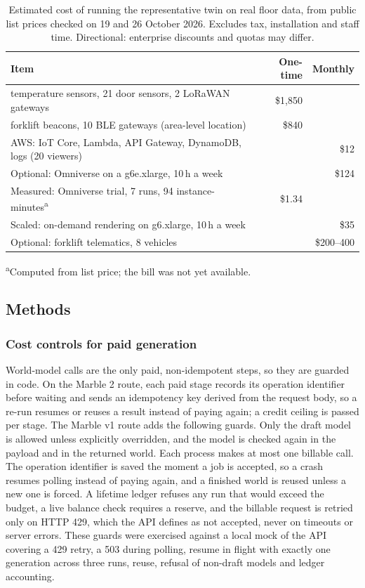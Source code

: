 \documentclass{article}
\begin{document}
\begin{table}[t]
\caption{Estimated cost of running the representative twin on real floor
data, from public list prices checked on 19 and 26 October 2026. Excludes tax, installation
and staff time. Directional: enterprise discounts and quotas may differ.}
\centering\small
\begin{tabularx}{\linewidth}{@{}>{\raggedright\arraybackslash}Xrr@{}}
\toprule
Item & One-time & Monthly \\
\midrule
24 temperature sensors, 21 door sensors, 2 LoRaWAN gateways & \$1{,}850 & \\
8 forklift beacons, 10 BLE gateways (area-level location) & \$840 & \\
AWS: IoT Core, Lambda, API Gateway, DynamoDB, logs (20 viewers) & & \$12 \\
Optional: Omniverse on a g6e.xlarge, 10\,h a week & & \$124 \\
Measured: Omniverse trial, 7 runs, 94 instance-minutes\textsuperscript{a} & \$1.34 & \\
Scaled: on-demand rendering on g6.xlarge, 10\,h a week & & \$35 \\
Optional: forklift telematics, 8 vehicles & & \$200--400 \\
\bottomrule
\end{tabularx}
\par\footnotesize\textsuperscript{a}Computed from list price; the bill was not yet available.
\label{tab:costest}
\end{table}

\subsection{Methods}
\subsubsection{Cost controls for paid generation}
World-model calls are the only paid, non-idempotent steps, so they are
guarded in code. On the Marble 2 route, each paid stage records its operation
identifier before waiting and sends an idempotency key derived from the request
body, so a re-run resumes or reuses a result instead of paying again; a credit
ceiling is passed per stage. The Marble v1 route adds the following guards.
Only the draft model is allowed unless explicitly overridden, and the model is
checked again in the payload and in the returned world. Each process makes at
most one billable call. The operation identifier is saved the moment a job is
accepted, so a crash resumes polling instead of paying again, and a finished
world is reused unless a new one is forced. A lifetime ledger refuses any run
that would exceed the budget, a live balance check requires a reserve, and the
billable request is retried only on HTTP 429, which the API defines as not
accepted, never on timeouts or server errors. These guards were exercised
against a local mock of the API covering a 429 retry, a 503 during polling,
resume in flight with exactly one generation across three runs, reuse,
refusal of non-draft models and ledger accounting.
\end{document}
